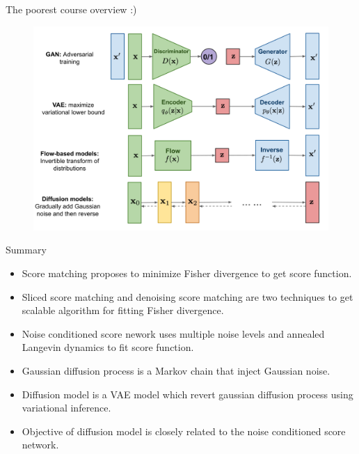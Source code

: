 \begin{frame}{The poorest course overview :)}
	\begin{figure}
		\includegraphics[width=\linewidth]{figs/generative-overview}
	\end{figure}
\end{frame}
\begin{frame}{Summary}
	\begin{itemize}
		\item Score matching proposes to minimize Fisher divergence to get score function.
		\vfill
		\item Sliced score matching and denoising score matching are two techniques to get scalable algorithm for fitting Fisher divergence.
		\vfill
		\item Noise conditioned score nework uses multiple noise levels and annealed Langevin dynamics to fit score function.
		\vfill
		\item Gaussian diffusion process is a Markov chain that inject Gaussian noise.
		\vfill
		\item Diffusion model is a VAE model which revert gaussian diffusion process using variational inference.
		\vfill
		\item Objective of diffusion model is closely related to the noise conditioned score network.
	\end{itemize}
\end{frame}
 